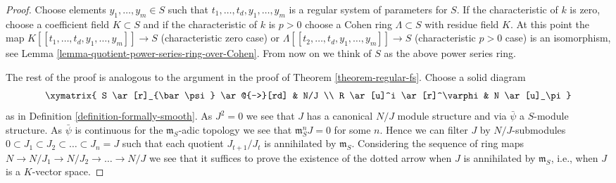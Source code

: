 \begin{proof}
\medskip\noindent
Choose elements $y_1, \ldots, y_m \in S$ such that
$t_1, \ldots, t_d, y_1, \ldots, y_m$ is a regular system of parameters
for $S$. If the characteristic of $k$ is zero, choose a coefficient
field $K \subset S$ and if the characteristic of $k$ is $p > 0$
choose a Cohen ring $\Lambda \subset S$ with residue field $K$.
At this point the map $K[[t_1, \ldots, t_d, y_1, \ldots, y_m]] \to S$
(characteristic zero case) or
$\Lambda[[t_2, \ldots, t_d, y_1, \ldots, y_m]] \to S$
(characteristic $p > 0$ case) is an isomorphism, see
Lemma \ref{lemma-quotient-power-series-ring-over-Cohen}.
From now on we think of $S$ as the above power series ring.

\medskip\noindent
The rest of the proof is analogous to the argument
in the proof of Theorem \ref{theorem-regular-fs}. Choose a solid diagram
$$
\xymatrix{
S \ar[r]_{\bar\psi} \ar@{-->}[rd] & N/J \\
R \ar[u]^i \ar[r]^\varphi & N \ar[u]_\pi
}
$$
as in Definition \ref{definition-formally-smooth}. As $J^2 = 0$ we see
that $J$ has a canonical $N/J$ module structure and via $\bar\psi$ a
$S$-module structure. As $\bar\psi$ is continuous for the
$\mathfrak m_S$-adic topology we see that $\mathfrak m_S^nJ = 0$ for some
$n$. Hence we can filter $J$ by $N/J$-submodules
$0 \subset J_1 \subset J_2 \subset \ldots \subset J_n = J$
such that each quotient $J_{t + 1}/J_t$ is annihilated by $\mathfrak m_S$.
Considering the sequence of ring maps
$N \to N/J_1 \to N/J_2 \to \ldots \to N/J$
we see that it suffices to prove the existence of the dotted arrow when
$J$ is annihilated by $\mathfrak m_S$, i.e., when $J$ is a
$K$-vector space.


\end{proof}
